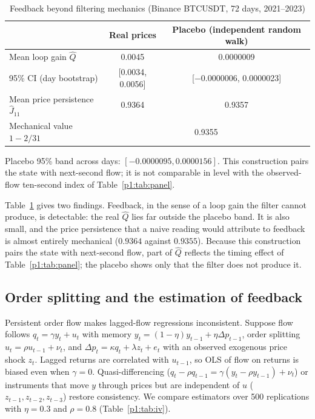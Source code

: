 \begin{table}[t]\centering
\begin{threeparttable}
\caption{Feedback beyond filtering mechanics (Binance BTCUSDT, 72 days, 2021--2023)}\label{p1:tab:feedback}
\begin{tabular}{lcc}
\toprule
 & Real prices & Placebo (independent random walk)\\
\midrule
Mean loop gain $\hat Q$ & 0.0045 & 0.0000009\\
95\% CI (day bootstrap) & [0.0034, 0.0056] & [$-$0.0000006, 0.0000023]\\
Mean price persistence $\hat J_{11}$ & 0.9364 & 0.9357\\
Mechanical value $1-2/31$ & \multicolumn{2}{c}{0.9355}\\
\bottomrule
\end{tabular}
\begin{tablenotes}\footnotesize\item Placebo 95\% band across days: $[-0.0000095,0.0000156]$. This construction pairs the state with next-second flow; it is not comparable in level with the observed-flow ten-second index of Table~\ref{p1:tab:panel}.\end{tablenotes}
\end{threeparttable}
\end{table}

Table~\ref{p1:tab:feedback} gives two findings. Feedback, in the sense of a loop gain the filter cannot produce, is detectable: the real $\hat Q$ lies far outside the placebo band. It is also small, and the price persistence that a naive reading would attribute to feedback is almost entirely mechanical ($0.9364$ against $0.9355$). Because this construction pairs the state with next-second flow, part of $\hat Q$ reflects the timing effect of Table~\ref{p1:tab:panel}; the placebo shows only that the filter does not produce it.

\subsection{Order splitting and the estimation of feedback}

Persistent order flow makes lagged-flow regressions inconsistent. Suppose flow follows $q_t=\gamma y_t+u_t$ with memory $y_t=(1-\eta)y_{t-1}+\eta\Delta p_{t-1}$, order splitting $u_t=\rho u_{t-1}+\nu_t$, and $\Delta p_t=\kappa q_t+\lambda z_t+e_t$ with an observed exogenous price shock $z_t$. Lagged returns are correlated with $u_{t-1}$, so OLS of flow on returns is biased even when $\gamma=0$. Quasi-differencing ($q_t-\rho q_{t-1}=\gamma(y_t-\rho y_{t-1})+\nu_t$) or instruments that move $y$ through prices but are independent of $u$ ($z_{t-1},z_{t-2},z_{t-3}$) restore consistency. We compare estimators over 500 replications with $\eta=0.3$ and $\rho=0.8$ (Table~\ref{p1:tab:iv}).

